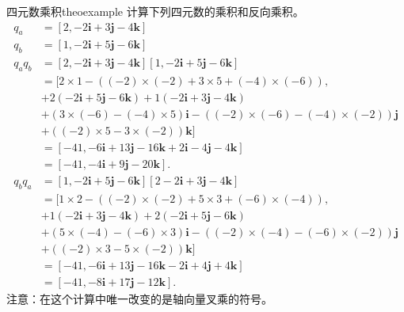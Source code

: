 \begin{myexample}{四元数乘积}{theoexample}
计算下列四元数的乘积和反向乘积。
$$
    \begin{aligned}
        q_{a}       & =[2,-2 \mathbf{i}+3 \mathbf{j}-4 \mathbf{k}]                                            \\
        q_{b}       & =[1,-2 \mathbf{i}+5 \mathbf{j}-6 \mathbf{k}]                                            \\
        q_{a} q_{b} & =[2,-2 \mathbf{i}+3 \mathbf{j}-4 \mathbf{k}][1,-2 \mathbf{i}+5 \mathbf{j}-6 \mathbf{k}] \\
                    & =[2 \times 1-((-2) \times(-2)+3 \times 5+(-4) \times(-6)),                              \\
                    & +2(-2 \mathbf{i}+5 \mathbf{j}-6 \mathbf{k})+1(-2 \mathbf{i}+3 \mathbf{j}-4 \mathbf{k})  \\
                    & +(3 \times(-6)-(-4) \times 5) \mathbf{i}-((-2) \times(-6)-(-4) \times(-2)) \mathbf{j}   \\
                    & +((-2) \times 5-3 \times(-2)) \mathbf{k}]                                               \\
                    & =[-41,-6 \mathbf{i}+13 \mathbf{j}-16 \mathbf{k}+2 \mathbf{i}-4 \mathbf{j}-4 \mathbf{k}] \\
                    & =[-41,-4 \mathbf{i}+9 \mathbf{j}-20 \mathbf{k}] .                                       \\
        q_{b} q_{a} & =[1,-2 \mathbf{i}+5 \mathbf{j}-6 \mathbf{k}][2-2 \mathbf{i}+3 \mathbf{j}-4 \mathbf{k}]  \\
                    & =[1 \times 2-((-2) \times(-2)+5 \times 3+(-6) \times(-4)),                              \\
                    & +1(-2 \mathbf{i}+3 \mathbf{j}-4 \mathbf{k})+2(-2 \mathbf{i}+5 \mathbf{j}-6 \mathbf{k})  \\
                    & +(5 \times(-4)-(-6) \times 3) \mathbf{i}-((-2) \times(-4)-(-6) \times(-2)) \mathbf{j}   \\
                    & +((-2) \times 3-5 \times(-2)) \mathbf{k}]                                               \\
                    & =[-41,-6 \mathbf{i}+13 \mathbf{j}-16 \mathbf{k}-2 \mathbf{i}+4 \mathbf{j}+4 \mathbf{k}] \\
                    & =[-41,-8 \mathbf{i}+17 \mathbf{j}-12 \mathbf{k}] .
    \end{aligned}
$$
注意：在这个计算中唯一改变的是轴向量叉乘的符号。
\end{myexample}

